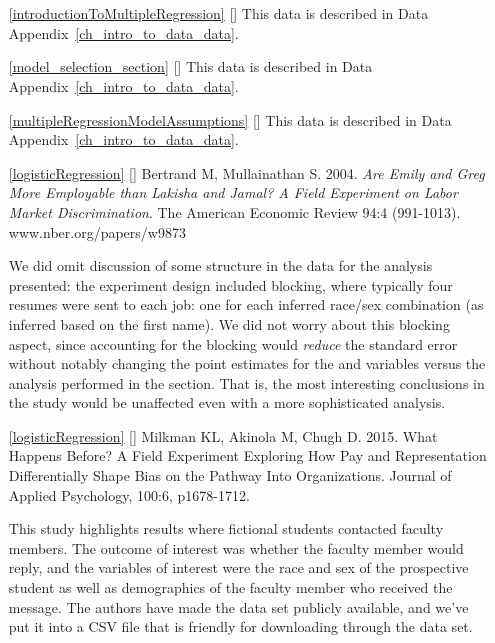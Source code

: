 \section{}
\label{ch_regr_mult_and_log_data}

\begin{itemize}
\item[\ref{introductionToMultipleRegression}]
    [\datalink{loans\_full\_schema}]
    This data is described in
    Data Appendix~\ref{ch_intro_to_data_data}.

\item[\ref{model_selection_section}]
    [\datalink{loans\_full\_schema}]
    This data is described in
    Data Appendix~\ref{ch_intro_to_data_data}.

\item[\ref{multipleRegressionModelAssumptions}]
    [\datalink{loans\_full\_schema}]
    This data is described in
    Data Appendix~\ref{ch_intro_to_data_data}.

\item[\ref{logisticRegression}]
    [\datalink{resume}]
    Bertrand M, Mullainathan S. 2004.
    \emph{Are Emily and Greg More Employable than Lakisha and Jamal?
    A Field Experiment on Labor Market Discrimination}.
    The American Economic Review 94:4 (991-1013).
        {www.nber.org/papers/w9873}

    We did omit discussion of some structure in
    the data for the analysis presented:
    the experiment design included blocking,
    where typically four resumes were sent to each job:
    one for each inferred race/sex combination
    (as inferred based on the first name).
    We did not worry about this blocking aspect,
    since accounting for the blocking would
    \emph{reduce} the standard error without notably
    changing the point estimates for the
     and  variables
    versus the analysis performed in the section.
    That is, the most interesting conclusions in the
    study would be unaffected even with a more
    sophisticated analysis.

\item[\ref{logisticRegression}]
    [\datalink{research\_reply}]
    Milkman KL, Akinola M, Chugh D. 2015.
    What Happens Before?
    A Field Experiment Exploring How Pay and
    Representation Differentially Shape Bias
    on the Pathway Into Organizations.
    Journal of Applied Psychology, 100:6, p1678-1712.

    This study highlights results where fictional students
    contacted faculty members.
    The outcome of interest was whether the faculty member
    would reply, and the variables of interest were the
    race and sex of the prospective student as well as
    demographics of the faculty member who received the message.
    The authors have made the data set publicly available,
    and we've put it into a CSV file that is friendly
    for downloading through the  data set.

\end{itemize}

